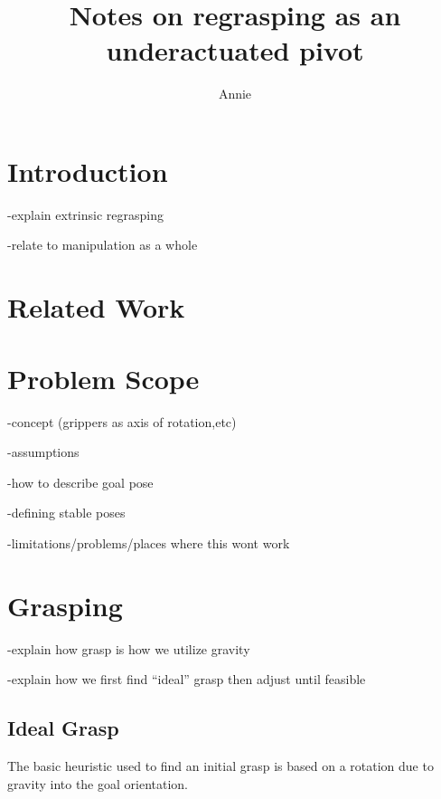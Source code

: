 \documentclass{article}
\begin{document}
\title{Notes on regrasping as an underactuated pivot}
\author{Annie}
\maketitle


\providecommand{\abs}[1]{\left\vert#1\right\vert}
\providecommand{\norm}[1]{\left\Vert#1\right\Vert}

\section{Introduction}

-explain extrinsic regrasping

-relate to manipulation as a whole


\section{Related Work}

\section{Problem Scope}

-concept (grippers as axis of rotation,etc)

-assumptions

-how to describe goal pose

-defining stable poses

-limitations/problems/places where this wont work


\section{Grasping}

-explain how grasp is how we utilize gravity

-explain how we first find ``ideal'' grasp then adjust until feasible

\subsection{Ideal Grasp}

The basic heuristic used to find an initial grasp is based on a rotation due to gravity into the goal orientation. 
\end{document}
